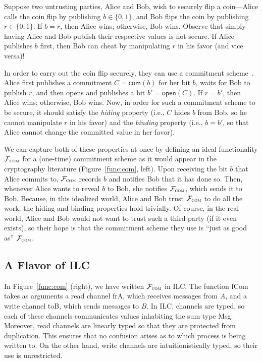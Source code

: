  Suppose two untrusting parties, Alice
and Bob, wish to securely flip a coin---Alice calls the coin flip by publishing $b
\in \{ 0, 1\}$, and Bob flips the coin by publishing $r \in \{0, 1\}$. If $b = r$,
then Alice wins; otherwise, Bob wins. Observe that simply having Alice and Bob
publish their respective values is not secure. If Alice publishes $b$ first,
then Bob can cheat by manipulating $r$ in his favor (and vice versa)!

In order to carry out the coin flip securely, they can use a commitment
scheme~\cite{brassard1988minimum}. Alice first publishes a commitment $C =
\mathsf{com}(b)$ for her bit $b$, waits for Bob to publish $r$, and then opens
and publishes a bit $b' = \mathsf{open}(C)$. If $r = b'$, then Alice wins;
otherwise, Bob wins.  Now, in order for such a commitment scheme to be secure,
it should satisfy the \emph{hiding} property (i.e., $C$ hides $b$ from Bob, so
he cannot manipulate $r$ in his favor) and the \emph{binding} property (i.e.,
$b=b'$, so that Alice cannot change the committed value in her favor).\smallskip

 We can capture both of these properties at
once by defining an ideal functionality $\mathcal{{F}}_{\textsc{com}}$ for a (one-time)
commitment scheme as it would appear in the cryptography literature
(Figure~\ref{func:com}, left). Upon receiving the bit $b$ that Alice commits to,
$\mathcal{{F}}_{\textsc{com}}$ records $b$ and notifies Bob that it has done so. Then,
whenever Alice wants to reveal $b$ to Bob, she notifies $\mathcal{{F}}_{\textsc{com}}$,
which sends it to Bob. Because, in this idealized world, Alice and Bob trust
$\mathcal{{F}}_{\textsc{com}}$ to do all the work, the hiding and binding properties
hold trivially. Of course, in the real world, Alice and Bob would not want to
trust such a third party (if it even exists), so their hope is that the
commitment scheme they use is ``just as good as''
$\mathcal{{F}}_{\textsc{com}}$.\smallskip

\subsection{A Flavor of ILC}
\label{subsec:ilc-flavored}

In Figure~\ref{func:com} (right), we have written $\mathcal{{F}}_{\textsc{com}}$ in
ILC. The function \textsf{fCom} takes as arguments a read channel \textsf{frA},
which receives messages from $A$, and a write channel \textsf{toB}, which sends
messages to $B$. In ILC, channels are typed, so each of these channels
communicates values inhabiting the sum type \textsf{Msg}. Moreover, read
channels are linearly typed so that they are protected from duplication. This
ensures that no confusion arises as to which process is being written to. On the
other hand, write channels are intuitionistically typed, so their use is
unrestricted.

